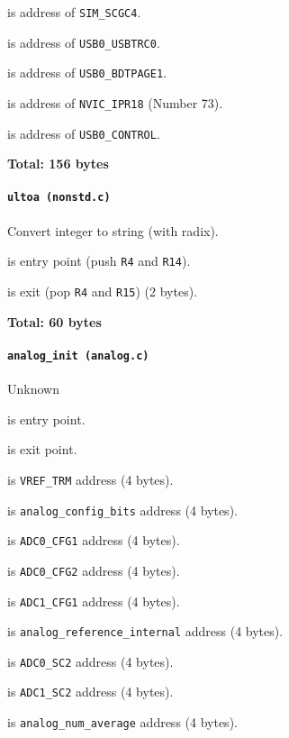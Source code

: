  is address of \texttt{SIM\_SCGC4}.

 is address of \texttt{USB0\_USBTRC0}.

 is address of \texttt{USB0\_BDTPAGE1}.

 is address of \texttt{NVIC\_IPR18} (Number 73).

 is address of \texttt{USB0\_CONTROL}.

\textbf{Total: 156 bytes}

\paragraph{\texttt{ultoa (nonstd.c)}} Convert integer to string (with radix).

 is entry point (push \texttt{R4} and \texttt{R14}).

 is exit (pop \texttt{R4} and \texttt{R15}) (2 bytes).

\textbf{Total: 60 bytes}

\paragraph{\texttt{analog\_init (analog.c)}} Unknown

 is entry point.

 is exit point.

 is \texttt{VREF\_TRM} address (4 bytes).

 is \texttt{analog\_config\_bits} address (4 bytes).

 is \texttt{ADC0\_CFG1} address (4 bytes).

 is \texttt{ADC0\_CFG2} address (4 bytes).

 is \texttt{ADC1\_CFG1} address (4 bytes).

 is \texttt{analog\_reference\_internal} address
(4 bytes).

 is \texttt{ADC0\_SC2} address (4 bytes).

 is \texttt{ADC1\_SC2} address (4 bytes).

 is \texttt{analog\_num\_average} address (4 bytes).

